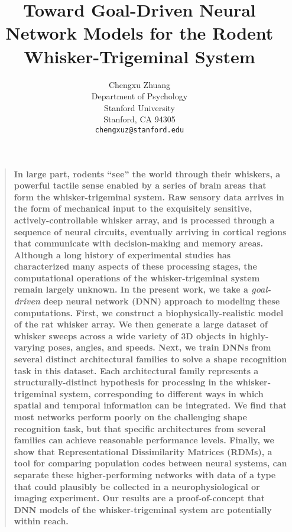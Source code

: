 \documentclass{article}
\title{Toward Goal-Driven Neural Network Models for the Rodent Whisker-Trigeminal System}
\author{
Chengxu Zhuang\\
Department of Psychology\\
Stanford University\\
Stanford, CA 94305 \\
\texttt{chengxuz@stanford.edu} \\
}
\newenvironment{sciabstract}{%
\begin{quote} \bf}
{\end{quote}}
\begin{document}

\maketitle

\begin{sciabstract}
In large part, rodents ``see'' the world through their whiskers, a powerful tactile sense enabled by a series of brain areas that form the whisker-trigeminal system. 
Raw sensory data arrives in the form of mechanical input to the exquisitely sensitive, actively-controllable whisker array, and is processed through a sequence of neural circuits, eventually arriving in cortical regions that communicate with decision-making and memory areas.
Although a long history of experimental studies has characterized many aspects of these processing stages, the computational operations of the whisker-trigeminal system remain largely unknown.
In the present work, we take a \emph{goal-driven} deep neural network (DNN) approach to modeling these computations.
First, we construct a biophysically-realistic model of the rat whisker array.  
We then generate a large dataset of whisker sweeps across a wide variety of 3D objects in highly-varying poses, angles, and speeds.
Next, we train DNNs from several distinct architectural families to solve a shape recognition task in this dataset. 
Each architectural family represents a structurally-distinct hypothesis for processing in the whisker-trigeminal system,  corresponding to different ways in which spatial and temporal information can be integrated.
We find that most networks perform poorly on the challenging shape recognition task, but that specific architectures from several families can achieve reasonable performance levels.
Finally, we show that Representational Dissimilarity Matrices (RDMs), a tool for comparing population codes between neural systems, can separate these higher-performing networks with data of a type that could plausibly be collected in a neurophysiological or imaging experiment.
Our results are a proof-of-concept that DNN models of the whisker-trigeminal system are potentially within reach.
\end{sciabstract}

\end{document}

